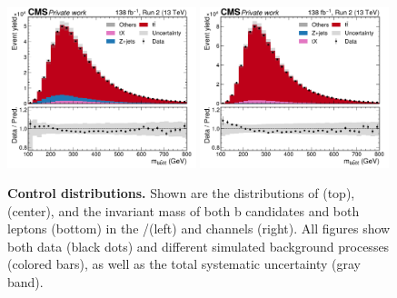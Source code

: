\begin{figure}[!hp]
    \includegraphics[width=0.49\textwidth]{figures/ah/controlplots/ReqMET/sf/mbbll_ReqMET_sf.pdf}
    \hfill
    \includegraphics[width=0.49\textwidth]{figures/ah/controlplots/ReqMET/em/mbbll_ReqMET_em.pdf}
    \caption{
        \textbf{Control distributions.} Shown are the distributions of \ptmiss (top), \mll (center), and the invariant mass \mbbll of both b candidates and both leptons  (bottom) in the \ee/\mumu (left) and \emu channels (right). All figures show both data (black dots) and different simulated background processes (colored bars), as well as the total systematic uncertainty (gray band). 
    }
    \label{fig:ah:control3}
\end{figure}

